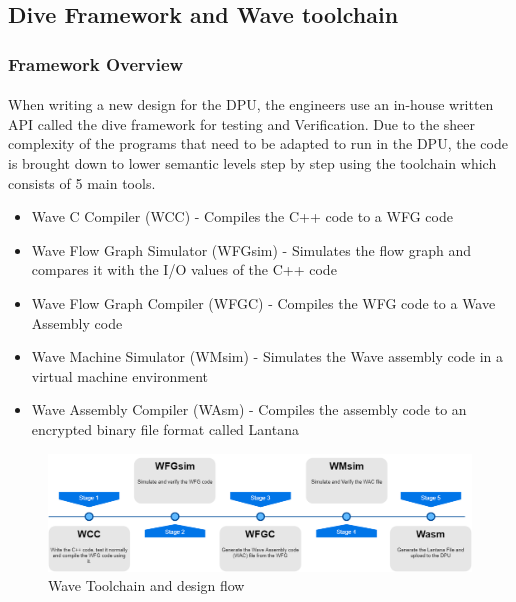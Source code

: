 
\newpage
\subsection{Dive Framework and Wave toolchain}

\subsubsection{Framework Overview}

\paragraph{}
When writing a new design for the DPU, the engineers use an in-house written API called the dive framework for testing and Verification. Due to the sheer complexity of the programs that need to be adapted to run in the DPU, the code is brought down to lower semantic levels step by step using the toolchain which consists of 5 main tools.

\begin{itemize}
    \item Wave C Compiler (WCC) - Compiles the C++ code to a WFG code 
    \item Wave Flow Graph Simulator (WFGsim) - Simulates the flow graph and compares it with the I/O values of the C++ code
    \item Wave Flow Graph Compiler (WFGC) - Compiles the WFG code to a Wave Assembly code
    \item Wave Machine Simulator (WMsim) - Simulates the Wave assembly code in a virtual machine environment
    \item Wave Assembly Compiler (WAsm) - Compiles the assembly code to an encrypted binary file format called Lantana
\end{itemize}


\begin{figure}[H]
    \centering
    \includegraphics[trim=0cm 0cm 0cm 0cm, clip=true,scale=0.35]{figures/wave_flow.png}
    \caption{Wave Toolchain and design flow\label{Fig:waveflow}}\vspace{-4mm}
    \end{figure}

